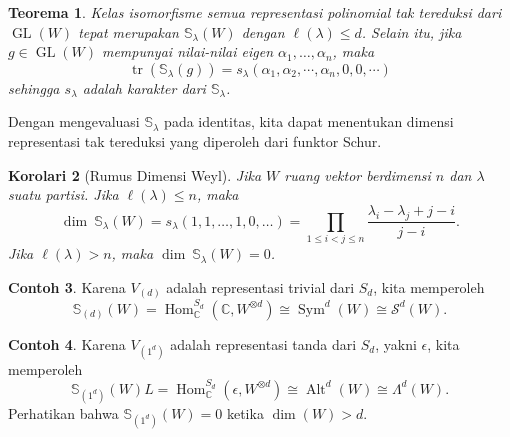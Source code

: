 \documentclass[12pt]{article}
\theoremstyle{plain}
\newtheorem{theorem}{Teorema}[section]
\newtheorem{corollary}[theorem]{Korolari}
\theoremstyle{definition}
\newtheorem{example}[theorem]{Contoh}
\theoremstyle{remark}
\numberwithin{equation}{section}
\begin{document}
\begin{theorem}
Kelas isomorfisme semua representasi \emph{polinomial}
tak tereduksi
dari $\operatorname{GL}(W)$ tepat merupakan $\mathbb{S}_\lambda(W)$
dengan $\ell(\lambda) \le d$.
Selain itu, jika $g \in \operatorname{GL}(W)$ mempunyai nilai-nilai eigen
$\alpha_1,\ldots, \alpha_n$, maka
\[
\operatorname{tr}(\mathbb{S}_\lambda(g)) = s_\lambda(\alpha_1,\alpha_2,\cdots,
\alpha_n,0,0,\cdots)
\]
sehingga $s_\lambda$ adalah karakter dari $\mathbb{S}_\lambda$.
\end{theorem}

Dengan mengevaluasi $\mathbb{S}_\lambda$ pada identitas, kita dapat menentukan
dimensi representasi tak tereduksi yang diperoleh dari funktor
Schur.

\begin{corollary}[Rumus Dimensi Weyl]
Jika $W$ ruang vektor berdimensi $n$ dan $\lambda$ suatu partisi.
Jika $\ell(\lambda) \le n$, maka
\[
\dim\ \mathbb{S}_\lambda(W) = s_\lambda(1,1,\ldots,1,0,\ldots)
= \prod_{1 \le i < j \le n} \frac{\lambda_i-\lambda_j +  j - i}{j-i}.
\]
Jika $\ell(\lambda) > n$, maka $\dim\ \mathbb{S}_\lambda(W) = 0$.
\end{corollary}

\begin{example}
Karena $V_{(d)}$ adalah representasi trivial dari $S_d$,
kita memperoleh
\[
\mathbb{S}_{(d)}(W) = \operatorname{Hom}^{S_d}_{\mathbb{C}}(\mathbb{C},W^{\otimes d})
\cong \operatorname{Sym}^d(W) \cong \mathcal{S}^d(W) .
\]
\end{example}

\begin{example}
Karena $V_{(1^d)}$ adalah representasi tanda dari $S_d$, yakni $\epsilon$,
kita memperoleh
\[
\mathbb{S}_{(1^d)}(W)L = \operatorname{Hom}^{S_d}_{\mathbb{C}}(\epsilon,W^{\otimes d})
\cong \operatorname{Alt}^d(W) \cong \Lambda^d(W) .
\]
Perhatikan bahwa $\mathbb{S}_{(1^d)}(W)=0$ ketika $\dim(W) > d$.
\end{example}



\end{document}
